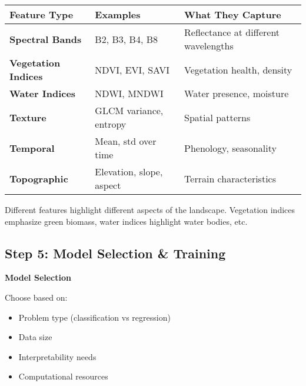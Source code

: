 \documentclass[
  letterpaper,
  DIV=11,
  numbers=noendperiod]{scrartcl}
\providecommand{\tightlist}{%
  \setlength{\itemsep}{0pt}\setlength{\parskip}{0pt}}
\begin{document}
\begin{longtable}[]{@{}
  >{\raggedright\arraybackslash}p{}
  >{\raggedright\arraybackslash}p{}
  >{\raggedright\arraybackslash}p{}@{}}
\toprule\noalign{}
\begin{minipage}[b]{\linewidth}\raggedright
\textbf{Feature Type}
\end{minipage} & \begin{minipage}[b]{\linewidth}\raggedright
\textbf{Examples}
\end{minipage} & \begin{minipage}[b]{\linewidth}\raggedright
\textbf{What They Capture}
\end{minipage} \\
\midrule\noalign{}
\endhead
\bottomrule\noalign{}
\endlastfoot
\textbf{Spectral Bands} & B2, B3, B4, B8 & Reflectance at different
wavelengths \\
\textbf{Vegetation Indices} & NDVI, EVI, SAVI & Vegetation health,
density \\
\textbf{Water Indices} & NDWI, MNDWI & Water presence, moisture \\
\textbf{Texture} & GLCM variance, entropy & Spatial patterns \\
\textbf{Temporal} & Mean, std over time & Phenology, seasonality \\
\textbf{Topographic} & Elevation, slope, aspect & Terrain
characteristics \\
\end{longtable}

Different features highlight different aspects of the landscape.
Vegetation indices emphasize green biomass, water indices highlight
water bodies, etc.

\subsection{Step 5: Model Selection \&
Training}\label{step-5-model-selection-training}

\textbf{Model Selection}

Choose based on:

\begin{itemize}
\tightlist
\item
  Problem type (classification vs regression)
\item
  Data size
\item
  Interpretability needs
\item
  Computational resources
\end{itemize}
\end{document}
